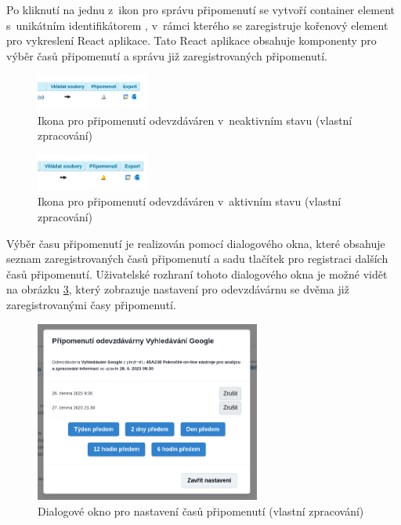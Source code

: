 Po kliknutí na jednu z~ikon pro správu připomenutí se vytvoří container element s~unikátním identifikátorem , v~rámci kterého se zaregistruje kořenový element pro vykreslení React aplikace. Tato React aplikace obsahuje komponenty pro výběr časů připomenutí a správu již zaregistrovaných připomenutí. 

\begin{figure}[H]\centering
    \includegraphics[width=0.33\textwidth]{img/pripomenuti-off.png}
    \caption{Ikona pro připomenutí odevzdáváren v~neaktivním stavu (vlastní zpracování)}
    \label{fig:pripomenuti-off}
\end{figure}

\begin{figure}[H]\centering
    \includegraphics[width=0.33\textwidth]{img/pripomenuti-on.png}
    \caption{Ikona pro připomenutí odevzdáváren v~aktivním stavu (vlastní zpracování)}
    \label{fig:pripomenuti-on}
\end{figure}

Výběr času připomenutí je realizován pomocí dialogového okna, které obsahuje seznam zaregistrovaných časů připomenutí a sadu tlačítek pro registraci dalších časů připomenutí. Uživatelské rozhraní tohoto dialogového okna je možné vidět na obrázku \ref{fig:pripomenuti-modal}, který zobrazuje nastavení pro odevzdávárnu se dvěma již zaregistrovanými časy připomenutí.

\begin{figure}[H]\centering
    \includegraphics[width=0.66\textwidth]{img/pripomenuti-modal.png}
    \caption{Dialogové okno pro nastavení časů připomenutí (vlastní zpracování)}
    \label{fig:pripomenuti-modal}
\end{figure}

